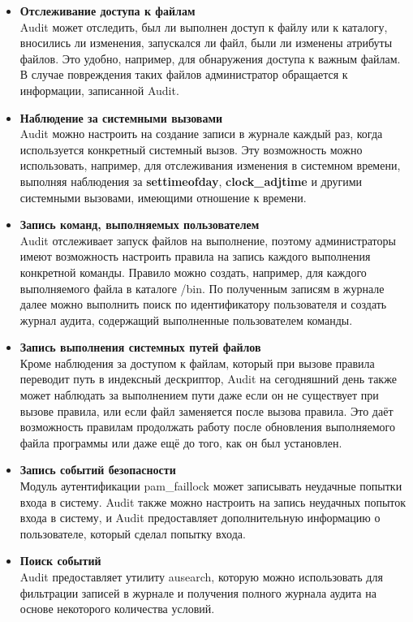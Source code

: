 \documentclass[a4paper,10pt,twoside]{article}
\begin{document}
\begin{itemize}
 \item \textbf{Отслеживание доступа к файлам}\\
Audit может отследить, был ли выполнен доступ к файлу или к каталогу, вносились ли изменения, запускался ли файл, были ли изменены атрибуты файлов. Это удобно, например, для обнаружения доступа к важным файлам. В случае повреждения таких файлов администратор обращается к информации, записанной Audit. 
\item \textbf{Наблюдение за системными вызовами}\\
Audit можно настроить на создание записи в журнале каждый раз, когда используется конкретный системный вызов. Эту возможность можно использовать, например, для отслеживания изменения в системном времени, выполняя наблюдения за \textbf{settimeofday}, \textbf{clock\_adjtime} и другими системными вызовами, имеющими отношение к времени.
\item \textbf{Запись команд, выполняемых пользователем}\\
Audit отслеживает запуск файлов на выполнение, поэтому администраторы имеют возможность настроить правила на запись каждого выполнения конкретной команды. Правило можно создать, например, для каждого выполняемого файла в каталоге /bin. По полученным записям в журнале далее можно выполнить поиск по идентификатору пользователя и создать журнал аудита, содержащий выполненные пользователем команды.
\item \textbf{Запись выполнения системных путей файлов}\\
Кроме наблюдения за доступом к файлам, который при вызове правила переводит путь в индексный дескриптор, Audit на сегодняшний день также может наблюдать за выполнением пути даже если он не существует при вызове правила, или если файл заменяется после вызова  правила. Это даёт возможность правилам продолжать работу после обновления выполняемого файла программы или даже ещё до того, как он был установлен.
\item \textbf{Запись событий безопасности}\\
Модуль аутентификации pam\_faillock может записывать неудачные попытки входа в систему. Audit также можно настроить на запись неудачных попыток входа в систему, и Audit предоставляет дополнительную информацию о пользователе, который сделал попытку входа.
\item \textbf{Поиск событий}\\
Audit предоставляет утилиту ausearch, которую можно использовать для фильтрации записей в журнале и получения полного журнала аудита на основе некоторого количества условий.

\end{itemize}
\end{document}
